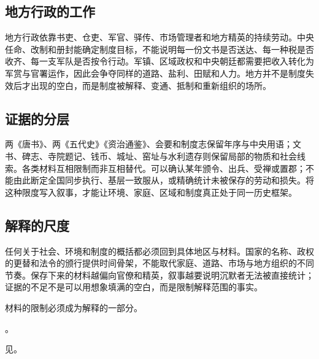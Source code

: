 \subsection{地方行政的工作}

地方行政依靠书吏、仓吏、军官、驿传、市场管理者和地方精英的持续劳动。中央任命、改制和册封能确定制度目标，不能说明每一份文书是否送达、每一种税是否收齐、每一支军队是否按令行动。军镇、区域政权和中央朝廷都需要把收入转化为军赏与官署运作，因此会争夺同样的道路、盐利、田赋和人力。地方并不是制度失效后才出现的空白，而是制度被解释、变通、抵制和重新组织的场所。

\subsection{证据的分层}

两《唐书》、两《五代史》《资治通鉴》、会要和制度志保留年序与中央用语；文书、碑志、寺院题记、钱币、城址、窑址与水利遗存则保留局部的物质和社会线索。各类材料互相限制而非互相替代。可以确认某年颁令、出兵、受禅或置郡；不能由此断定全国同步执行、基层一致服从，或精确统计未被保存的劳动和损失。将这种限度写入叙事，才能让环境、家庭、区域和制度真正处于同一历史框架。

\subsection{解释的尺度} 任何关于社会、环境和制度的概括都必须回到具体地区与材料。国家的名称、政权的更替和法令的颁行提供时间骨架，不能取代家庭、道路、市场与地方组织的不同节奏。保存下来的材料越偏向官僚和精英，叙事越要说明沉默者无法被直接统计；证据的不足不是可以用想象填满的空白，而是限制解释范围的事实。

材料的限制必须成为解释的一部分。

。

见。
